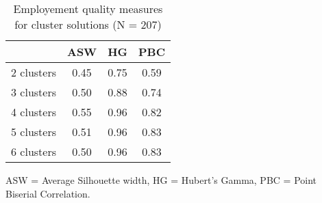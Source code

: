 \begin{table}[htp]
\footnotesize
\setlength{\tabcolsep}{35pt}
\renewcommand{\arraystretch}{1.3}
\begin{threeparttable}
\centering
\caption{Employement quality measures for cluster solutions (N = 207)} 
\label{tab:quality_clusters_job}
\begin{tabular}{lccc}
  \hline
 & ASW & HG & PBC \\ 
  \hline
2 clusters & 0.45 & 0.75 & 0.59 \\ 
  3 clusters & 0.50 & 0.88 & 0.74 \\ 
  4 clusters & 0.55 & 0.96 & 0.82 \\ 
  5 clusters & 0.51 & 0.96 & 0.83 \\ 
  6 clusters & 0.50 & 0.96 & 0.83 \\ 
   \hline
\end{tabular}
\begin{tablenotes}
\scriptsize
\item ASW = Average Silhouette width, HG = Hubert's Gamma, PBC = Point Biserial Correlation.
\end{tablenotes}
\end{threeparttable}
\end{table}
